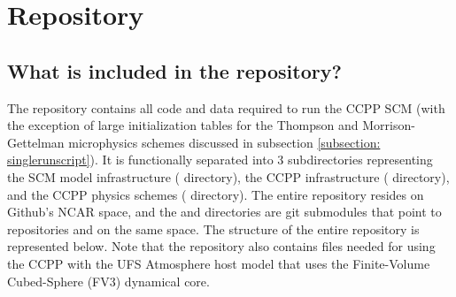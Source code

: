 \chapter{Repository}
\label{chapter: repository}

\section{What is included in the repository?}
The repository contains all code and data required to run the CCPP SCM (with the exception of large initialization tables for the Thompson and Morrison-Gettelman microphysics schemes discussed in subsection \ref{subsection: singlerunscript}). It is functionally separated into 3 subdirectories representing the SCM model infrastructure ( directory), the CCPP infrastructure ( directory), and the CCPP physics schemes ( directory). The entire  repository resides on Github's NCAR space, and the  and  directories are git submodules that point to repositories  and  on the same space. The structure of the entire repository is represented below. Note that the  repository also contains files needed for using the CCPP with the UFS Atmosphere host model that uses the Finite-Volume Cubed-Sphere (FV3) dynamical core.

